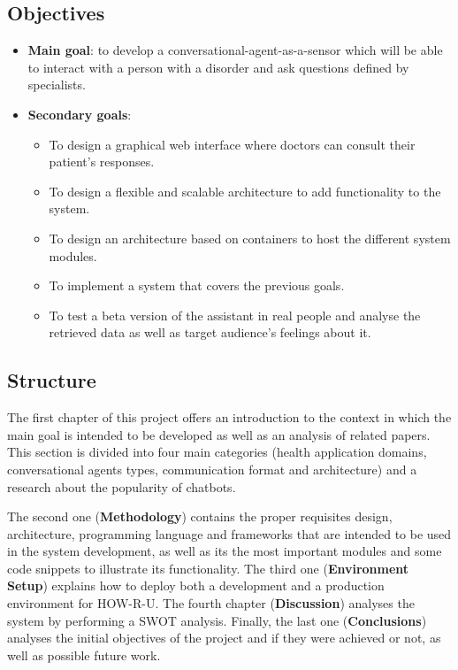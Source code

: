 \documentclass[12pt,english]{article}
\begin{document}
\subsection{Objectives}
\label{sec:objectives}
\begin{itemize}
  \item \textbf{Main goal}: to develop a conversational-agent-as-a-sensor which will be able to interact with a person with a disorder and ask questions defined by specialists.
  \item \textbf{Secondary goals}:
    \begin{itemize}
      \item To design a graphical web interface where doctors can consult their patient's responses.
      \item To design a flexible and scalable architecture to add functionality to the system.
      \item To design an architecture based on containers to host the different system modules.
      \item To implement a system that covers the previous goals.
      \item To test a beta version of the assistant in real people and analyse the retrieved data as well as target audience's feelings about it.
    \end{itemize}
\end{itemize}

\subsection{Structure}

The first chapter of this project offers an introduction to the context in which the main goal is intended to be developed as well as an analysis of related papers. This section is divided into four main categories (health application domains, conversational agents types, communication format and architecture) and a research about the popularity of chatbots.

The second one (\textbf{Methodology}) contains the proper requisites design, architecture, programming language and frameworks that are intended to be used in the system development, as well as its the most important modules and some code snippets to illustrate its functionality. The third one (\textbf{Environment Setup}) explains how to deploy both a development and a production environment for HOW-R-U. The fourth chapter (\textbf{Discussion}) analyses the system by performing a SWOT analysis. Finally, the last one (\textbf{Conclusions}) analyses the initial objectives of the project and if they were achieved or not, as well as possible future work.
\end{document}
